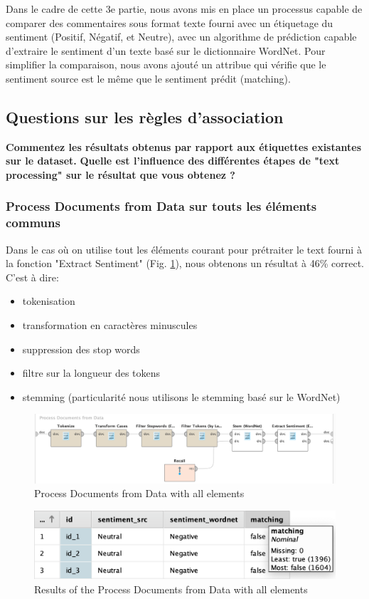 \documentclass[a4paper]{article}
\begin{document}
Dans le cadre de cette 3e partie, nous avons mis en place un processus capable de comparer des commentaires sous format texte fourni avec un étiquetage du sentiment (Positif, Négatif, et Neutre), avec un algorithme de prédiction capable d'extraire le sentiment d'un texte basé sur le dictionnaire WordNet. Pour simplifier la comparaison, nous avons ajouté un attribue qui vérifie que le sentiment source est le même que le sentiment prédit (matching).

\subsection{Questions sur les règles d'association}

\textbf{Commentez les résultats obtenus par rapport aux étiquettes existantes sur le dataset.}
\textbf{Quelle est l'influence des différentes étapes de "text processing" sur le résultat que vous obtenez ?}

\subsubsection{Process Documents from Data sur touts les éléments communs}
Dans le cas où on utilise tout les éléments courant pour prétraiter le text fourni à la fonction "Extract Sentiment" (Fig. \ref{fig:3_processing_documents_full}), nous obtenons un résultat à 46\% correct.
C'est à dire:
	
\begin{itemize}
	\item tokenisation
	\item transformation en caractères minuscules
	\item suppression des stop words
	\item filtre sur la longueur des tokens
	\item stemming (particularité nous utilisons le stemming basé sur le WordNet)
\end{itemize}

\begin{figure}[H]
	\includegraphics[width=\linewidth]{imgs/part_3/3_processing_documents_full}
	\caption{Process Documents from Data with all elements}
	\label{fig:3_processing_documents_full}
\end{figure}
\begin{figure}[H]
	\includegraphics[width=\linewidth]{imgs/part_3/3_processing_documents_full_results}
	\caption{Results of the Process Documents from Data with all elements}
	\label{fig:3_processing_documents_full_results}
\end{figure}
\end{document}
